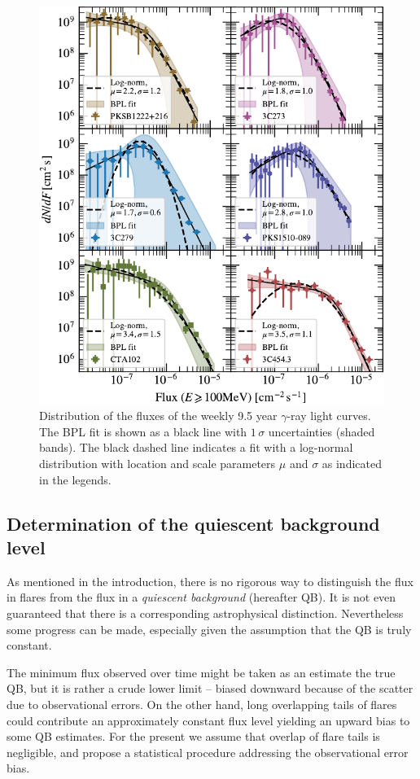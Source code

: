 \documentclass[twocolumn,linenumbers]{aastex62}
\newcommand{\gray}{$\gamma$-ray\xspace}
\begin{document}
\begin{figure}
    \includegraphics[width = .99\linewidth]{figures/fluxdist_weekly_tsmin9.pdf}
    \caption{\label{fig:fluxpdf} Distribution of the fluxes of the weekly 9.5 year \gray light curves. The BPL fit is shown as a black line with $1\,\sigma$ uncertainties (shaded bands). The black dashed line indicates a fit with a log-normal distribution with location and scale parameters $\mu$ and $\sigma$ as indicated in the legends.}
\end{figure}

\subsection{Determination of the quiescent background level}
\label{sec:qb}
As mentioned in the introduction, 
there is no rigorous way to distinguish the 
flux in flares from the flux 
in a {\em quiescent background} (hereafter QB).
It is not even guaranteed that
there is a corresponding astrophysical distinction.
Nevertheless some progress can be made,
especially given the assumption that the QB is
truly constant.

The minimum flux observed over time 
might be taken as an estimate the true QB,
but it is rather a crude lower limit  -- biased downward 
because of the scatter due to observational errors.
On the other hand, long overlapping tails of flares 
could contribute an approximately constant flux level
yielding an upward bias to some QB estimates.
For the present we assume that overlap of flare tails
is negligible, and propose a statistical
procedure addressing the observational error bias.
\end{document}
